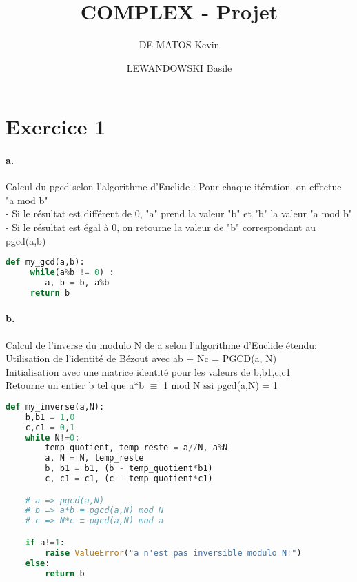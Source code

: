 \documentclass[french]{article}
\author{
    DE MATOS Kevin\\
    \and
    LEWANDOWSKI Basile\\
}
\title{COMPLEX - Projet}
\begin{document}
\maketitle
\section*{Exercice 1}
\paragraph{a.} Calcul du pgcd selon l'algorithme d'Euclide :
Pour chaque itération, on effectue "a mod b"\\
 - Si le résultat est différent de 0, "a" prend la valeur "b" et "b" la valeur "a mod b"\\
 - Si le résultat est égal à 0, on retourne la valeur de "b" correspondant au pgcd(a,b)
 \begin{lstlisting}[language=Python, belowskip=-1 \baselineskip]
def my_gcd(a,b): 
     while(a%b != 0) : 
        a, b = b, a%b 
     return b
\end{lstlisting}
\paragraph{b.}Calcul de l’inverse du modulo N de a selon l'algorithme d’Euclide étendu:\\
Utilisation de l'identité de Bézout avec ab + Nc = PGCD(a, N)\\
Initialisation avec une matrice identité pour les valeurs de b,b1,c,c1\\
Retourne un entier b tel que a*b $\equiv$ 1 mod N ssi pgcd(a,N) = 1\\
\begin{lstlisting}[language=Python]
def my_inverse(a,N):
    b,b1 = 1,0
    c,c1 = 0,1
    while N!=0:
        temp_quotient, temp_reste = a//N, a%N 
        a, N = N, temp_reste
        b, b1 = b1, (b - temp_quotient*b1)
        c, c1 = c1, (c - temp_quotient*c1)

    # a => pgcd(a,N)
    # b => a*b ≡ pgcd(a,N) mod N
    # c => N*c ≡ pgcd(a,N) mod a

    if a!=1:
        raise ValueError("a n'est pas inversible modulo N!")
    else:
        return b
\end{lstlisting} 
\newpage 
\end{document}
